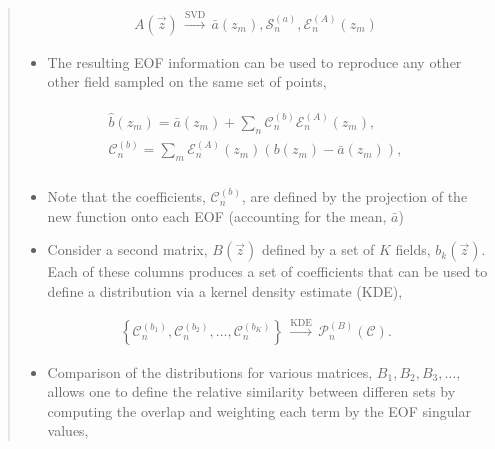 \documentclass[letterpaper,10pt,english]{sphinxmanual}
\begin{document}
\begin{itemize}
\begin{quote}
\begin{itemize}
\end{itemize}
\begin{equation*}
\begin{split}A \left( \vec{z} \right)
\, \xrightarrow{\text{SVD}} \,
\bar{a} \left( z_m \right), \mathcal{S}_n^{(a)}, \mathcal{E}_n^{(A)} \left( z_m \right)\end{split}
\end{equation*}\begin{itemize}
\item {} 
The resulting EOF information can be used to reproduce any other other field sampled on the same set of points,

\end{itemize}
\begin{align*}\!\begin{aligned}
\hat{b} \left( z_m \right) = \bar{a} \left( z_m \right) + \sum_n{ \mathcal{C}_n^{(b)} \mathcal{E}_n^{(A)} \left( z_m \right)},\\
\mathcal{C}_n^{(b)} = \sum_m{\mathcal{E}_n^{(A)} \left( z_m \right) \left( b \left( z_m \right) - \bar{a} \left( z_m \right) \right)},\\
\end{aligned}\end{align*}\begin{itemize}
\item {} 
Note that the coefficients, \(\mathcal{C}_n^{(b)}\), are defined by the projection of the new function onto each EOF (accounting for the mean, \(\bar{a}\))

\item {} 
Consider a second matrix, \(B\left( \vec{z} \right)\) defined by a set of \(K\) fields, \(b_k \left( \vec{z} \right)\).  Each of these columns produces a set of coefficients that can be used to define a distribution via a kernel density estimate (KDE),

\end{itemize}
\begin{equation*}
\begin{split}\left\{ \mathcal{C}_n^{(b_1)},  \mathcal{C}_n^{(b_2)}, \ldots, \mathcal{C}_n^{(b_K)} \right\}
    \, \xrightarrow{\text{KDE}} \,
    \mathcal{P}_n^{(B)} \left( \mathcal{C} \right).\end{split}
\end{equation*}\begin{itemize}
\item {} 
Comparison of the distributions for various matrices, \(B_1, B_2, B_3, \ldots\), allows one to define the relative similarity between differen sets by computing the overlap and weighting each term by the EOF singular values,


\end{itemize}
\end{quote}
\end{itemize}
\end{document}
